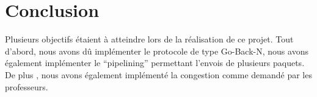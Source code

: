 \documentclass[a4paper,10pt]{article}
\begin{document}
\section{Conclusion}
Plusieurs objectifs étaient à atteindre lors de la réalisation de ce projet. Tout d'abord, nous avons dû implémenter le 
protocole de type Go-Back-N, nous avons également implémenter le ``pipelining'' permettant l'envois de plusieurs paquets.
De plus , nous avons également implémenté la congestion comme demandé par les professeurs.\\
\end{document}
